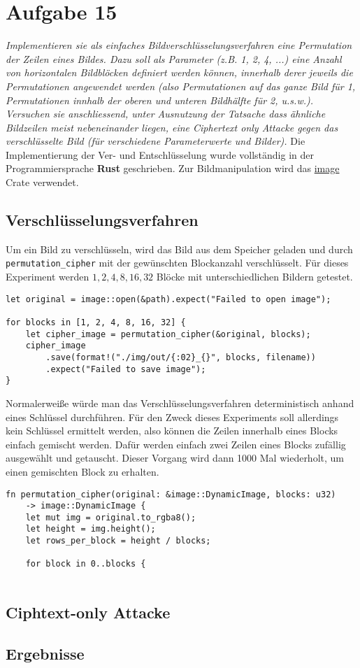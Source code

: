 \section{Aufgabe 15}
\textit{Implementieren sie als einfaches Bildverschlüsselungsverfahren eine Permutation der
Zeilen eines Bildes. Dazu soll als Parameter (z.B. 1, 2, 4, ...) eine Anzahl von
horizontalen Bildblöcken definiert werden können, innerhalb derer jeweils die Permutationen angewendet werden (also Permutationen auf das ganze Bild für 1, Permutationen innhalb der oberen und unteren Bildhälfte für 2, u.s.w.). Versuchen
sie anschliessend, unter Ausnutzung der Tatsache dass ähnliche Bildzeilen meist
nebeneinander liegen, eine Ciphertext only Attacke gegen das verschlüsselte Bild
(für verschiedene Parameterwerte und Bilder).}\vspace*{1em}\newline
Die Implementierung der Ver- und Entschlüsselung wurde vollständig in der Programmiersprache
\textbf{Rust} geschrieben. Zur Bildmanipulation wird das \href{https://docs.rs/image/latest/image/}{image} Crate verwendet. 
\subsection{Verschlüsselungsverfahren}
Um ein Bild zu verschlüsseln, wird das Bild aus dem Speicher geladen und durch \verb|permutation_cipher| mit der
gewünschten Blockanzahl verschlüsselt. Für
dieses Experiment werden $1,2,4,8,16,32$ Blöcke mit unterschiedlichen Bildern getestet. 
\begin{verbatim}
let original = image::open(&path).expect("Failed to open image");

for blocks in [1, 2, 4, 8, 16, 32] {
    let cipher_image = permutation_cipher(&original, blocks);
    cipher_image
        .save(format!("./img/out/{:02}_{}", blocks, filename))
        .expect("Failed to save image");
}
\end{verbatim}
Normalerweiße würde man das Verschlüsselungsverfahren deterministisch anhand eines
Schlüssel durchführen. Für den Zweck dieses Experiments soll allerdings 
kein Schlüssel ermittelt werden, also können die Zeilen innerhalb eines Blocks
einfach gemischt werden. Dafür werden einfach zwei Zeilen eines Blocks zufällig ausgewählt und
getauscht. Dieser Vorgang wird dann 1000 Mal wiederholt, um einen gemischten Block zu erhalten.
\begin{verbatim}
fn permutation_cipher(original: &image::DynamicImage, blocks: u32) 
    -> image::DynamicImage {
    let mut img = original.to_rgba8();
    let height = img.height();
    let rows_per_block = height / blocks;

    for block in 0..blocks {
    
\end{verbatim}
\subsection{Ciphtext-only Attacke}
\subsection{Ergebnisse}
